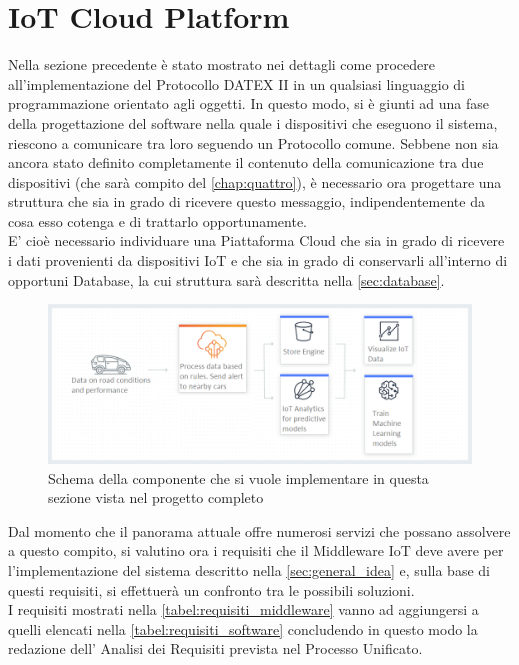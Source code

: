 \section{IoT Cloud Platform}
Nella sezione precedente è stato mostrato nei dettagli come procedere all'implementazione del Protocollo DATEX II in un qualsiasi linguaggio di programmazione orientato agli oggetti. In questo modo, si è giunti ad una fase della progettazione del software nella quale i dispositivi che eseguono il sistema, riescono a comunicare tra loro seguendo un Protocollo comune. Sebbene non sia ancora stato definito completamente il contenuto della comunicazione tra due dispositivi (che sarà compito del \autoref{chap:quattro}), è necessario ora progettare una struttura che sia in grado di ricevere questo messaggio, indipendentemente da cosa esso cotenga e di trattarlo opportunamente.\\
E' cioè necessario individuare una Piattaforma Cloud che sia in grado di ricevere i dati provenienti da dispositivi IoT e che sia in grado di conservarli all'interno di opportuni Database, la cui struttura sarà descritta nella \autoref{sec:database}.\\
\begin{figure}
	\begin{center}
		\includegraphics[width=0.9\columnwidth]{images/iot_middleware}
	\end{center}
	\caption{Schema della componente che si vuole implementare in questa sezione vista nel progetto completo}
	\label{fig:iot_middleware}
\end{figure}
Dal momento che il panorama attuale offre numerosi servizi che possano assolvere a questo compito, si valutino ora i requisiti che il Middleware IoT deve avere per l'implementazione del sistema descritto nella \autoref{sec:general_idea} e, sulla base di questi requisiti, si effettuerà un confronto tra le possibili soluzioni.\\
I requisiti mostrati nella \autoref{tabel:requisiti_middleware} vanno ad aggiungersi a quelli elencati nella \autoref{tabel:requisiti_software} concludendo in questo modo la redazione dell' Analisi dei Requisiti prevista nel Processo Unificato.\\\\
